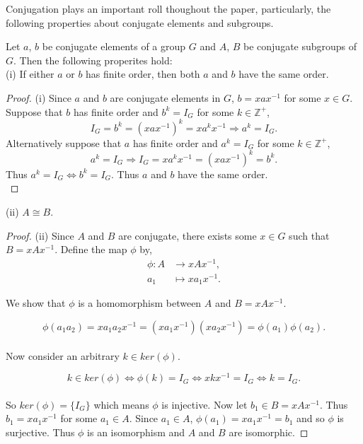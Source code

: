 Conjugation plays an important roll thoughout the paper, particularly, the following properties about conjugate elements and subgroups.

\begin{proposition}
    \label{conjugateprop} Let $a$, $b$ be conjugate elements of a group $G$ and $A$, $B$ be conjugate subgroups of $G$. Then the following properites hold: \vspace{3mm} \\
(i) If either $a$ or $b$ has finite order, then both $a$ and $b$ have the same order. \vspace{3mm} \\
\end{proposition}
\begin{proof}
    (i) Since $a$ and $b$ are conjugate elements in $G$, $b = xax^{-1}$ for some $x \in G$. Suppose that $b$ has finite order and $b^k = I_G$ for some $k \in \mathbb{Z}^+$,
    \begin{equation*} 
        I_G = b^k = (xax^{-1})^k = xa^{k}x^{-1} \Rightarrow a^k = I_G.
    \end{equation*}
    Alternatively suppose that $a$ has finite order and $a^k = I_G$ for some $k \in \mathbb{Z}^+$,
    \begin{equation*} 
        a^k = I_G \Rightarrow I_G = xa^{k}x^{-1} = (xax^{-1})^k = b^k.
    \end{equation*}
    Thus $a^k = I_G \iff b^k = I_G$. Thus $a$ and $b$ have the same order. \\
\end{proof}

\begin{proposition}
(ii) $A \cong B$.
\end{proposition}

\begin{proof}
(ii) Since $A$ and $B$ are conjugate, there exists some $x \in G$ such that $B=xAx^{-1}$. Define the map $\phi$ by,
\begin{align*}
\phi:A &\longrightarrow xAx^{-1}, \\
a_1 &\longmapsto xa_1x^{-1} \tag{$\forall \; a_1 \in A$}. 
\end{align*}

We show that $\phi$ is a homomorphism between $A$ and $B=xAx^{-1}$.

\begin{equation*}
\phi(a_1a_2) = x a_1 a_2 x^{-1} = ( xa_1x^{-1})( xa_2x^{-1}) = \phi(a_1) \phi(a_2).
\end{equation*}
\\
Now consider an arbitrary $k \in ker(\phi)$.

\begin{equation*}
k \in ker(\phi) \iff \phi(k) = I_G \iff  xkx^{-1} = I_G \iff k = I_G.
\end{equation*}
\\
So $ker(\phi) = \{ I_G \}$ which means $\phi$ is injective. Now let $b_1 \in B = xAx^{-1}$. Thus $b_1 = xa_1x^{-1}$ for some $a_1 \in A$. Since $a_1 \in A$, $\phi(a_1) = xa_1x^{-1} = b_1$ and so $\phi$ is surjective. Thus $\phi$ is an isomorphism and $A$ and $B$ are isomorphic.

\end{proof}


